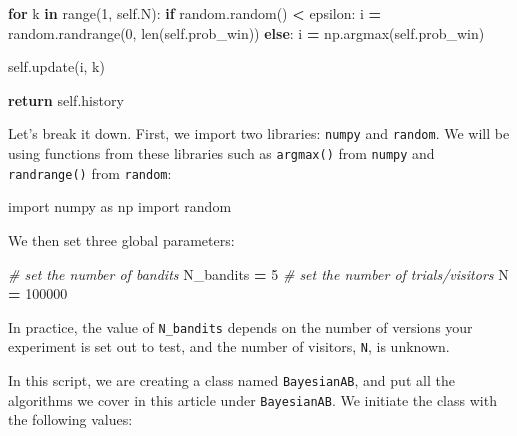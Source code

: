 \documentclass[
]{book}
\newenvironment{Shaded}{\begin{snugshade}}{\end{snugshade}}
\newcommand{\BuiltInTok}[1]{#1}
\newcommand{\CommentTok}[1]{\textcolor[rgb]{0.56,0.35,0.01}{\textit{#1}}}
\newcommand{\ControlFlowTok}[1]{\textcolor[rgb]{0.13,0.29,0.53}{\textbf{#1}}}
\newcommand{\DecValTok}[1]{\textcolor[rgb]{0.00,0.00,0.81}{#1}}
\newcommand{\ImportTok}[1]{#1}
\newcommand{\KeywordTok}[1]{\textcolor[rgb]{0.13,0.29,0.53}{\textbf{#1}}}
\newcommand{\NormalTok}[1]{#1}
\newcommand{\OperatorTok}[1]{\textcolor[rgb]{0.81,0.36,0.00}{\textbf{#1}}}
\newcommand{\VariableTok}[1]{\textcolor[rgb]{0.00,0.00,0.00}{#1}}
\theoremstyle{definition}
\theoremstyle{definition}
\theoremstyle{definition}
\theoremstyle{definition}
\theoremstyle{remark}
\begin{document}
\begin{Shaded}
\begin{Highlighting}[]
        \ControlFlowTok{for}\NormalTok{ k }\KeywordTok{in} \BuiltInTok{range}\NormalTok{(}\DecValTok{1}\NormalTok{, }\VariableTok{self}\NormalTok{.N):}
            \ControlFlowTok{if}\NormalTok{ random.random() }\OperatorTok{\textless{}}\NormalTok{ epsilon:}
\NormalTok{                i }\OperatorTok{=}\NormalTok{ random.randrange(}\DecValTok{0}\NormalTok{, }\BuiltInTok{len}\NormalTok{(}\VariableTok{self}\NormalTok{.prob\_win))}
            \ControlFlowTok{else}\NormalTok{:}
\NormalTok{                i }\OperatorTok{=}\NormalTok{ np.argmax(}\VariableTok{self}\NormalTok{.prob\_win)}

            \VariableTok{self}\NormalTok{.update(i, k)}

        \ControlFlowTok{return} \VariableTok{self}\NormalTok{.history}
\end{Highlighting}
\end{Shaded}

Let's break it down. First, we import two libraries: \texttt{numpy} and \texttt{random}. We will be using functions from these libraries such as \texttt{argmax()} from \texttt{numpy} and \texttt{randrange()} from \texttt{random}:

\begin{Shaded}
\begin{Highlighting}[]
\ImportTok{import}\NormalTok{ numpy }\ImportTok{as}\NormalTok{ np}
\ImportTok{import}\NormalTok{ random}
\end{Highlighting}
\end{Shaded}

We then set three global parameters:

\begin{Shaded}
\begin{Highlighting}[]
\CommentTok{\# set the number of bandits}
\NormalTok{N\_bandits }\OperatorTok{=} \DecValTok{5}
\CommentTok{\# set the number of trials/visitors}
\NormalTok{N }\OperatorTok{=} \DecValTok{100000}
\end{Highlighting}
\end{Shaded}

In practice, the value of \texttt{N\_bandits} depends on the number of versions your experiment is set out to test, and the number of visitors, \texttt{N}, is unknown.

In this script, we are creating a class named \texttt{BayesianAB}, and put all the algorithms we cover in this article under \texttt{BayesianAB}. We initiate the class with the following values:
\end{document}
